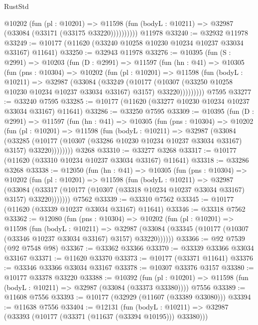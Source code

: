 \begin{lexlean}{RustStd}
\begin{coremodule}
            @10202
              (fun (pl : @10201) =>
              @11598 (fun (bodyL : @10211) => @32987 (@33084 (@33171 (@33175 @33220))))))))))
    @11978
@33240 := @32932 @11978
@33249 := @10177 (@11620 (@33240 @10258 @10230 @10234 @10237 @33034 @33167) @11641)
@33250 := @32943 @11978
@33276 := @10395
    (fun (S : @2991) =>
    @10203
      (fun (D : @2991) =>
      @11597
        (fun (hn : @41) =>
        @10305
          (fun (pns : @10304) =>
          @10202
            (fun (pl : @10201) =>
            @11598
              (fun (bodyL : @10211) =>
              @32987
                (@33084
                  (@33249
                    (@10177
                      (@10307 (@33250 @10258 @10230 @10234 @10237 @33034 @33167) @3157)
                      @33220)))))))))
    @7595
@33277 := @33240 @7595
@33285 := @10177 (@11620 (@33277 @10230 @10234 @10237 @33034 @33167) @11641)
@33286 := @33250 @7595
@33309 := @10395
    (fun (D : @2991) =>
    @11597
      (fun (hn : @41) =>
      @10305
        (fun (pns : @10304) =>
        @10202
          (fun (pl : @10201) =>
          @11598
            (fun (bodyL : @10211) =>
            @32987
              (@33084
                (@33285
                  (@10177 (@10307 (@33286 @10230 @10234 @10237 @33034 @33167) @3157) @33220))))))))
    @3268
@33310 := @33277 @3268
@33317 := @10177 (@11620 (@33310 @10234 @10237 @33034 @33167) @11641)
@33318 := @33286 @3268
@33338 := @12050
    (fun (hn : @41) =>
    @10305
      (fun (pns : @10304) =>
      @10202
        (fun (pl : @10201) =>
        @11598
          (fun (bodyL : @10211) =>
          @32987
            (@33084
              (@33317 (@10177 (@10307 (@33318 @10234 @10237 @33034 @33167) @3157) @33220)))))))
    @7562
@33339 := @33310 @7562
@33345 := @10177 (@11620 (@33339 @10237 @33034 @33167) @11641)
@33346 := @33318 @7562
@33362 := @12080
    (fun (pns : @10304) =>
    @10202
      (fun (pl : @10201) =>
      @11598
        (fun (bodyL : @10211) =>
        @32987 (@33084 (@33345 (@10177 (@10307 (@33346 @10237 @33034 @33167) @3157) @33220))))))
@33366 := @92 @7539 (@92 @7548 @98)
@33367 := @33362 @33366
@33370 := @33339 @33366 @33034 @33167
@33371 := @11620 @33370
@33373 := @10177 (@33371 @11641)
@33376 := @33346 @33366 @33034 @33167
@33378 := @10307 @33376 @3157
@33380 := @10177 @33378 @33220
@33388 := @10392
    (fun (pl : @10201) => @11598 (fun (bodyL : @10211) => @32987 (@33084 (@33373 @33380))))
    @7556
@33389 := @11608 @7556
@33393 := @10177 (@32929 (@11607 (@33389 @33080)))
@33394 := @11638 @7556
@33404 := @12131
    (fun (bodyL : @10211) => @32987 (@33393 (@10177 (@33371 (@11637 (@33394 @10195))) @33380)))

\end{coremodule}
\end{lexlean}
